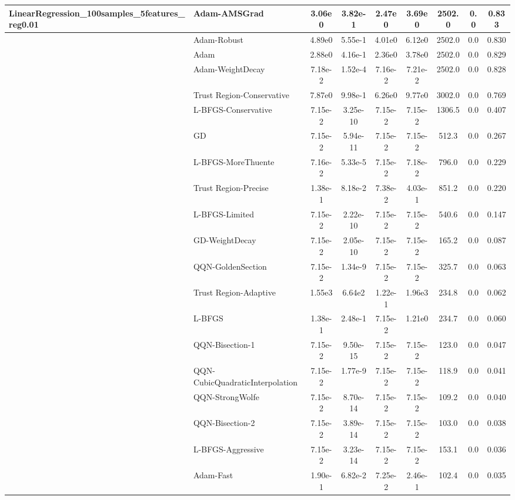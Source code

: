 \documentclass{article}
\begin{document}
\begin{longtable}{|l|l|c|c|c|c|c|c|c|}
LinearRegression\_100samples\_5features\_reg0.01 & \textbf{Adam-AMSGrad} & 3.06e0 & 3.82e-1 & 2.47e0 & 3.69e0 & 2502.0 & 0.0 & 0.833 \\
\hline
 & Adam-Robust & 4.89e0 & 5.55e-1 & 4.01e0 & 6.12e0 & 2502.0 & 0.0 & 0.830 \\
\hline
 & Adam & 2.88e0 & 4.16e-1 & 2.36e0 & 3.78e0 & 2502.0 & 0.0 & 0.829 \\
\hline
 & Adam-WeightDecay & 7.18e-2 & 1.52e-4 & 7.16e-2 & 7.21e-2 & 2502.0 & 0.0 & 0.828 \\
\hline
 & Trust Region-Conservative & 7.87e0 & 9.98e-1 & 6.26e0 & 9.77e0 & 3002.0 & 0.0 & 0.769 \\
\hline
 & L-BFGS-Conservative & 7.15e-2 & 3.25e-10 & 7.15e-2 & 7.15e-2 & 1306.5 & 0.0 & 0.407 \\
\hline
 & GD & 7.15e-2 & 5.94e-11 & 7.15e-2 & 7.15e-2 & 512.3 & 0.0 & 0.267 \\
\hline
 & L-BFGS-MoreThuente & 7.16e-2 & 5.33e-5 & 7.15e-2 & 7.18e-2 & 796.0 & 0.0 & 0.229 \\
\hline
 & Trust Region-Precise & 1.38e-1 & 8.18e-2 & 7.38e-2 & 4.03e-1 & 851.2 & 0.0 & 0.220 \\
\hline
 & L-BFGS-Limited & 7.15e-2 & 2.22e-10 & 7.15e-2 & 7.15e-2 & 540.6 & 0.0 & 0.147 \\
\hline
 & GD-WeightDecay & 7.15e-2 & 2.05e-10 & 7.15e-2 & 7.15e-2 & 165.2 & 0.0 & 0.087 \\
\hline
 & QQN-GoldenSection & 7.15e-2 & 1.34e-9 & 7.15e-2 & 7.15e-2 & 325.7 & 0.0 & 0.063 \\
\hline
 & Trust Region-Adaptive & 1.55e3 & 6.64e2 & 1.22e-1 & 1.96e3 & 234.8 & 0.0 & 0.062 \\
\hline
 & L-BFGS & 1.38e-1 & 2.48e-1 & 7.15e-2 & 1.21e0 & 234.7 & 0.0 & 0.060 \\
\hline
 & QQN-Bisection-1 & 7.15e-2 & 9.50e-15 & 7.15e-2 & 7.15e-2 & 123.0 & 0.0 & 0.047 \\
\hline
 & QQN-CubicQuadraticInterpolation & 7.15e-2 & 1.77e-9 & 7.15e-2 & 7.15e-2 & 118.9 & 0.0 & 0.041 \\
\hline
 & QQN-StrongWolfe & 7.15e-2 & 8.70e-14 & 7.15e-2 & 7.15e-2 & 109.2 & 0.0 & 0.040 \\
\hline
 & QQN-Bisection-2 & 7.15e-2 & 3.89e-14 & 7.15e-2 & 7.15e-2 & 103.0 & 0.0 & 0.038 \\
\hline
 & L-BFGS-Aggressive & 7.15e-2 & 3.23e-14 & 7.15e-2 & 7.15e-2 & 153.1 & 0.0 & 0.036 \\
\hline
 & Adam-Fast & 1.90e-1 & 6.82e-2 & 7.25e-2 & 2.46e-1 & 102.4 & 0.0 & 0.035 \\

\end{longtable}
\end{document}
